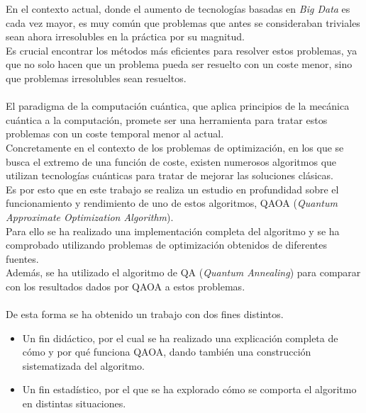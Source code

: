 En el contexto actual, donde el aumento de tecnologías basadas en \textit{Big Data} es cada vez mayor, es muy común que problemas que antes se consideraban triviales sean ahora irresolubles en la práctica por su magnitud.
\\
Es crucial encontrar los métodos más eficientes para resolver estos problemas, ya que no solo hacen que un problema pueda ser resuelto con un coste menor, sino que problemas irresolubles sean resueltos.
\\\\
El paradigma de la computación cuántica, que aplica principios de la mecánica cuántica a la computación, promete ser una herramienta para tratar estos problemas con un coste temporal menor al actual.
\\
Concretamente en el contexto de los problemas de optimización, en los que se busca el extremo de una función de coste, existen numerosos algoritmos que utilizan tecnologías cuánticas para tratar de mejorar las soluciones clásicas.
\\
Es por esto que en este trabajo se realiza un estudio en profundidad sobre el funcionamiento y rendimiento de uno de estos algoritmos, QAOA (\textit{Quantum Approximate Optimization Algorithm})\@.
\\
Para ello se ha realizado una implementación completa del algoritmo y se ha comprobado utilizando problemas de optimización obtenidos de diferentes fuentes.
\\
Además, se ha utilizado el algoritmo de QA (\textit{Quantum Annealing}) para comparar con los resultados dados por QAOA a estos problemas.
\\\\
De esta forma se ha obtenido un trabajo con dos fines distintos.
\begin{itemize}
\item Un fin didáctico, por el cual se ha realizado una explicación completa de cómo y por qué funciona QAOA\@, dando también una construcción sistematizada del algoritmo.

\item Un fin estadístico, por el que se ha explorado cómo se comporta el algoritmo en distintas situaciones.
\end{itemize}


